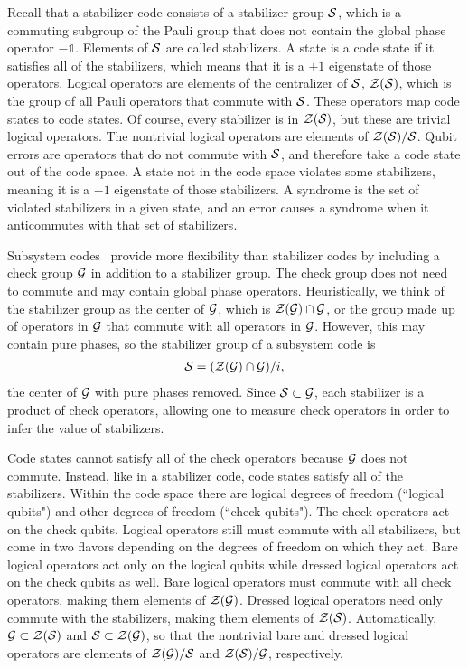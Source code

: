 Recall that a stabilizer code consists of a stabilizer group $\S$, which is a commuting subgroup of the Pauli group that does not contain the global phase operator $-\mathbb{1}$. Elements of $\S$ are called stabilizers. A state is a code state if it satisfies all of the stabilizers, which means that it is a $+1$ eigenstate of those operators. Logical operators are elements of the centralizer of $\S$, $\Z(\S)$, which is the group of all Pauli operators that commute with $\S$.
These operators map code states to code states. Of course, every stabilizer is in $\Z(\S)$, but these are trivial logical operators. The nontrivial logical operators are elements of $\Z(\S) / \S$. Qubit errors are operators that do not commute with $\S$, and therefore take a code state out of the code space. A state not in the code space violates some stabilizers, meaning it is a $-1$ eigenstate of those stabilizers. 
A syndrome is the set of violated stabilizers in a given state, and an error causes a syndrome when it anticommutes with that set of stabilizers. 

Subsystem codes~\cite{Poulin2005Subsystem} provide more flexibility than stabilizer codes by including a check group $\G$ in addition to a stabilizer group. The check group does not need to commute and may contain global phase operators. Heuristically, we think of the stabilizer group as the center of $\G$, which is $\Z(\G) \cap \G$, or the group made up of operators in $\G$ that commute with all operators in $\G$. However, this may contain pure phases, so the stabilizer group of a subsystem code is
\begin{align}
\S = (\Z(\G) \cap \G) / i,
\end{align}
the center of $\G$ with pure phases removed. Since $\S \subset \G$, each stabilizer is a product of check operators, allowing one to measure check operators in order to infer the value of stabilizers.

Code states cannot satisfy all of the check operators because $\G$ does not commute. Instead, like in a stabilizer code, code states satisfy all of the stabilizers. Within the code space there are logical degrees of freedom (``logical qubits") and other degrees of freedom (``check qubits").
The check operators act on the check qubits. Logical operators still must commute with all stabilizers, but come in two flavors depending on the degrees of freedom on which they act. Bare logical operators act only on the logical qubits while dressed logical operators act on the check qubits as well. Bare logical operators must commute with all check operators, making them elements of $\Z(\G)$. Dressed logical operators need only commute with the stabilizers, making them elements of $\Z(\S)$. Automatically, $\G \subset \Z(\S)$ and $\S \subset \Z(\G)$, so that the nontrivial bare and dressed logical operators are elements of $\Z(\G)/\S$ and $\Z(\S)/\G$, respectively.

